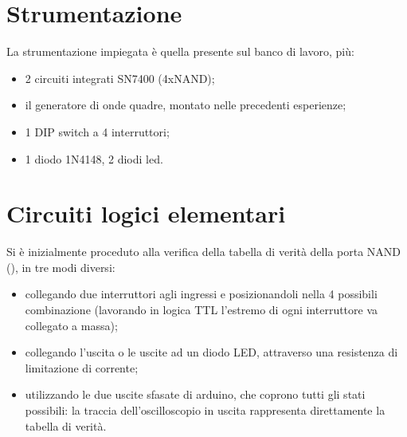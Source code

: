 \section{Strumentazione}
La strumentazione impiegata è quella presente sul banco di lavoro, più:
	\begin{itemize}
		\item 2 circuiti integrati SN7400 (4xNAND);
		\item il generatore di onde quadre, montato nelle precedenti esperienze;
		\item 1 DIP switch a 4 interruttori;
		\item 1 diodo 1N4148, 2 diodi led.
	\end{itemize}

\section{Circuiti logici elementari}
Si è inizialmente proceduto alla verifica della tabella di verità della porta NAND (), in tre modi diversi:
\begin{itemize}
	\item collegando due interruttori agli ingressi e posizionandoli nella 4 possibili combinazione (lavorando in logica TTL l'estremo di ogni interruttore va collegato a massa);
	\item collegando l’uscita o le uscite ad un diodo LED, attraverso una resistenza di limitazione di corrente;
	\item utilizzando le due uscite	sfasate di arduino, che coprono tutti gli stati possibili: la traccia dell’oscilloscopio
	in uscita rappresenta direttamente la tabella di verità.
\end{itemize}


